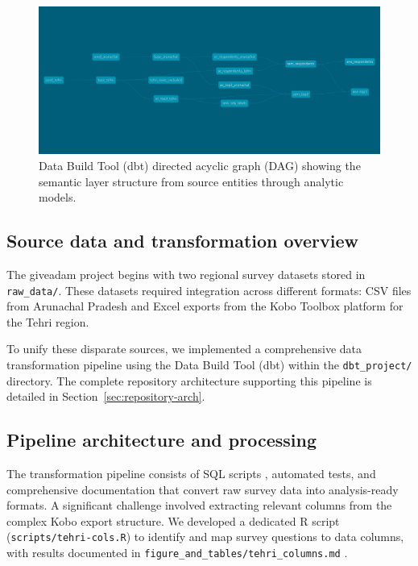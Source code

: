\documentclass{article}
\begin{document}
\begin{figure}[ht]
\centering
\includegraphics[width=\textwidth]{img/dbt-dag.png}
\caption{Data Build Tool (dbt) directed acyclic graph (DAG) showing the semantic layer structure from source entities through analytic models.}
\label{fig:dbtdag}
\end{figure}

\subsection{Source data and transformation overview}

The giveadam project begins with two regional survey datasets stored in \texttt{raw\_data/}. These datasets required integration across different formats: CSV files \cite{csv_rfc} from Arunachal Pradesh and Excel exports from the Kobo Toolbox \cite{kobo_toolbox} platform for the Tehri region. 

To unify these disparate sources, we implemented a comprehensive data transformation pipeline using the Data Build Tool (dbt) \cite{dbt_core,dbt_duckdb} within the \texttt{dbt\_project/} directory. The complete repository architecture supporting this pipeline is detailed in Section~\ref{sec:repository-arch}.

\subsection{Pipeline architecture and processing}

The transformation pipeline consists of SQL scripts \cite{sql}, automated tests, and comprehensive documentation that convert raw survey data into analysis-ready formats. A significant challenge involved extracting relevant columns from the complex Kobo export structure. We developed a dedicated R script \cite{r_core,tidyverse} (\texttt{scripts/tehri-cols.R}) to identify and map survey questions to data columns, with results documented in \texttt{figure\_and\_tables/tehri\_columns.md} \cite{markdown}.
\end{document}
